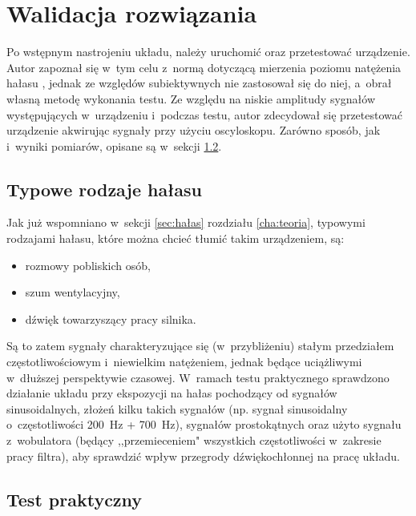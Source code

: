 \chapter{Walidacja rozwiązania}
\label{cha:tests}
Po wstępnym nastrojeniu układu, należy uruchomić oraz przetestować urządzenie. Autor zapoznał się w~tym celu z~normą dotyczącą mierzenia poziomu natężenia hałasu \cite{test_norm}, jednak ze względów subiektywnych nie zastosował się do niej, a~obrał własną metodę wykonania testu. Ze względu na niskie amplitudy sygnałów występujących w~urządzeniu i~podczas testu, autor zdecydował się przetestować urządzenie akwirując sygnały przy użyciu oscyloskopu. Zarówno sposób, jak i~wyniki pomiarów, opisane są w~sekcji \ref{sec:practical_test}.
\section{Typowe rodzaje hałasu}
Jak już wspomniano w~sekcji \ref{sec:hałas} rozdziału \ref{cha:teoria}, typowymi rodzajami hałasu, które można chcieć tłumić takim urządzeniem, są:
\begin{itemize}
	\item rozmowy pobliskich osób,
	\item szum wentylacyjny,
	\item dźwięk towarzyszący pracy silnika.
\end{itemize}
Są to zatem sygnały charakteryzujące się (w~przybliżeniu) stałym przedziałem częstotliwościowym i~niewielkim natężeniem, jednak będące uciążliwymi w~dłuższej perspektywie czasowej. W~ramach testu praktycznego sprawdzono działanie układu przy ekspozycji na hałas pochodzący od sygnałów sinusoidalnych, złożeń kilku takich sygnałów (np. sygnał sinusoidalny o~częstotliwości \SI{200}{\Hz} + \SI{700}{\Hz}), sygnałów prostokątnych oraz użyto sygnału z~wobulatora (będący ,,przemieceniem" wszystkich częstotliwości w~zakresie pracy filtra), aby sprawdzić wpływ przegrody dźwiękochłonnej na pracę układu.
\section{Test praktyczny}
\label{sec:practical_test}
